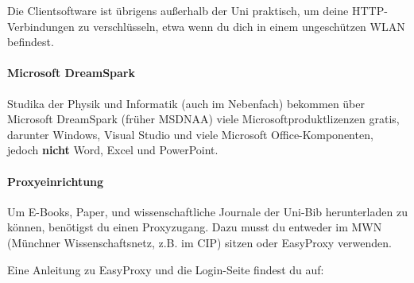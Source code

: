 Die Clientsoftware ist übrigens außerhalb der Uni praktisch, um deine
HTTP-Verbindungen zu verschlüsseln, etwa wenn du dich in einem
ungeschützen WLAN befindest.

\paragraph{Microsoft DreamSpark}

Studika der Physik und Informatik (auch im Nebenfach) bekommen über
Microsoft DreamSpark (früher MSDNAA) viele Microsoftproduktlizenzen
gratis, darunter Windows, Visual Studio und viele
Microsoft Office-Komponenten, jedoch \textbf{nicht} Word, Excel und PowerPoint.
\begin{urlList}
\end{urlList}

\paragraph{Proxyeinrichtung}

Um E-Books, Paper, und wissenschaftliche Journale der Uni-Bib
herunterladen zu können, benötigst du einen Proxyzugang. Dazu musst du
entweder im MWN (Münchner Wissenschaftsnetz, z.B. im CIP) sitzen oder
EasyProxy verwenden. 

Eine Anleitung zu EasyProxy und die Login-Seite findest du auf:
\begin{urlList}
\end{urlList}
